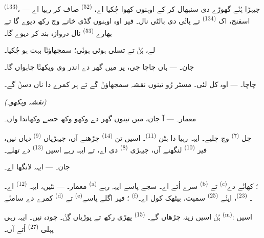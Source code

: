  \textsuperscript{(133)}، جیہڑا ہُݨے گھوڑے دی سنبھال کر کے اوہنوں
کھوا چُکیا اے،  \textsuperscript{(52)} صاف کر رہیا اے — اسفنج، اک
 \textsuperscript{(134)} تے پاݨی دی بالٹی نال۔ فیر اوہ اوہنوں گڈی
خانے وچ رکھ دیوے گا تے بھارے  \textsuperscript{(53)} نال دروازہ بند کر
دیوے گا۔

لے، ہُݨ تے تسلی ہوئی ہوݨی؛ سمجھاؤݨا بہت ہو چُکیا۔

\textsc{جان}۔ --- ہاں چاچا جی، پر میں گھر دے اندر وی ویکھݨا چاہواں گا۔

\textsc{چاچا}۔ --- اوہ کل لئی۔ مسٹر رُو تینوں نقشہ سمجھاؤݨ گے تے ہر کمرے دا ناں
دسݨ گے۔

\VUsaut{3.0mm}
\VUsaut{2.4mm}

{\centering\textit{(نقشہ ویکھو۔)}\par}
\VUsaut{2.4mm}

\textsc{معمار}۔ --- آ جان، میں تینوں گھر دے وکھو وکھ حصے وکھاندا واں۔

چل  \textsuperscript{(7)} وچ چلیے۔ ایہہ رہیا  دا
بٹن \textsuperscript{(11)}۔ اسیں تن  \textsuperscript{(14)} چڑھنے آں،
جیہڑیاں  \textsuperscript{(9)} دیاں نیں، فیر 
\textsuperscript{(10)} لنگھنے آں، جیہڑی  \textsuperscript{(8)} دی
اے، تے ایہہ رہے اسیں  \textsuperscript{(13)} دے تھلے۔

\textsc{جان}۔ --- ایہہ لانگھا اے۔

\textsc{معمار}۔ --- نئیں، ایہہ  \textsuperscript{(12)} اے۔
 \textsuperscript{(a)} سرے اُتے اے۔ سجے پاسے ایہہ رہے
 \textsuperscript{(b)} تے  \textsuperscript{(c)}؛
کھاݨے دے کمرے دے سامݨے  \textsuperscript{(d)} تے
 \textsuperscript{(e)}؛ فیر اگلے پاسے 
\textsuperscript{(f)}۔  \textsuperscript{(23)}، اپݨے
 \textsuperscript{(25)} سمیت، بیٹھک کول اے۔

ہُݨ اسیں زینہ چڑھاں گے۔  \textsuperscript{(15)} پھڑی رکھ تے پوڑیاں
گِݨ۔ چودہ نیں۔ ایہہ رہی  \textsuperscript{(m)}: اسیں پہلی
 \textsuperscript{(27)} اُتے آں۔

\VUsaut{3.0mm}
\VUsaut{3.0mm}

